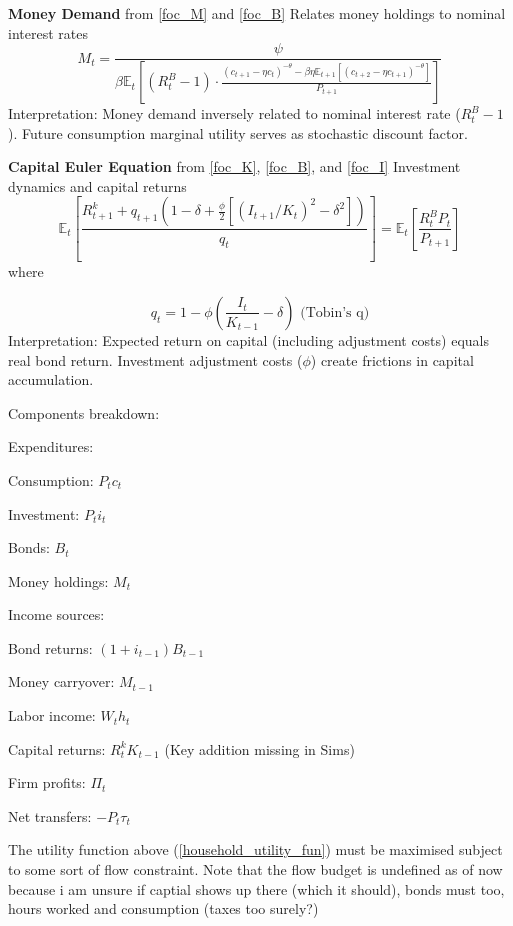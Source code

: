 \documentclass[11pt,preprint]{elsarticle}
\numberwithin{equation}{section}
\numberwithin{figure}{section}
\numberwithin{table}{section}
\begin{document}
\textbf{Money Demand} from \ref{foc_M} and \ref{foc_B} Relates money
holdings to nominal interest rates \begin{equation}\label{reduced_M}
M_t = \frac{\psi}
             {\beta \mathbb{E}_t \left[ (R^B_t - 1) \cdot \frac{(c_{t+1} - \eta c_t)^{-\theta} - \beta\eta \mathbb{E}_{t+1}[(c_{t+2} - \eta c_{t+1})^{-\theta}]}{P_{t+1}} \right]}
\end{equation} Interpretation: Money demand inversely related to nominal
interest rate (\(R^B_t - 1\)). Future consumption marginal utility
serves as stochastic discount factor.

\textbf{Capital Euler Equation} from \ref{foc_K}, \ref{foc_B}, and
\ref{foc_I} Investment dynamics and capital returns
\begin{equation}\label{reduced_K}
\mathbb{E}_t \left[ \frac{R^k_{t+1} + q_{t+1}(1-\delta + \tfrac{\phi}{2}[(I_{t+1}/K_t)^2 - \delta^2])}
                   {q_t} \right]
= \mathbb{E}_t \left[ \frac{R^B_t P_t}{P_{t+1}} \right]
\end{equation} where

\begin{equation}
q_t = 1 - \phi \left( \frac{I_t}{K_{t-1}} - \delta \right)
\text{ (Tobin's q)}
\end{equation} Interpretation: Expected return on capital (including
adjustment costs) equals real bond return. Investment adjustment costs
(\(\phi\)) create frictions in capital accumulation.

\newpage

Components breakdown:

Expenditures:

Consumption: \(P_t c_t\)

Investment: \(P_t i_t\)

Bonds: \(B_t\)

Money holdings: \(M_t\)

Income sources:

Bond returns: \((1 + i_{t-1}) B_{t-1}\)

Money carryover: \(M_{t-1}\)

Labor income: \(W_t h_t\)

Capital returns: \(R_t^k K_{t-1}\) (Key addition missing in Sims)

Firm profits: \(\Pi_t\)

Net transfers: \(-P_t \tau_t\)

The utility function above (\ref{household_utility_fun}) must be
maximised subject to some sort of flow constraint. Note that the flow
budget is undefined as of now because i am unsure if captial shows up
there (which it should), bonds must too, hours worked and consumption
(taxes too surely?)
\end{document}

